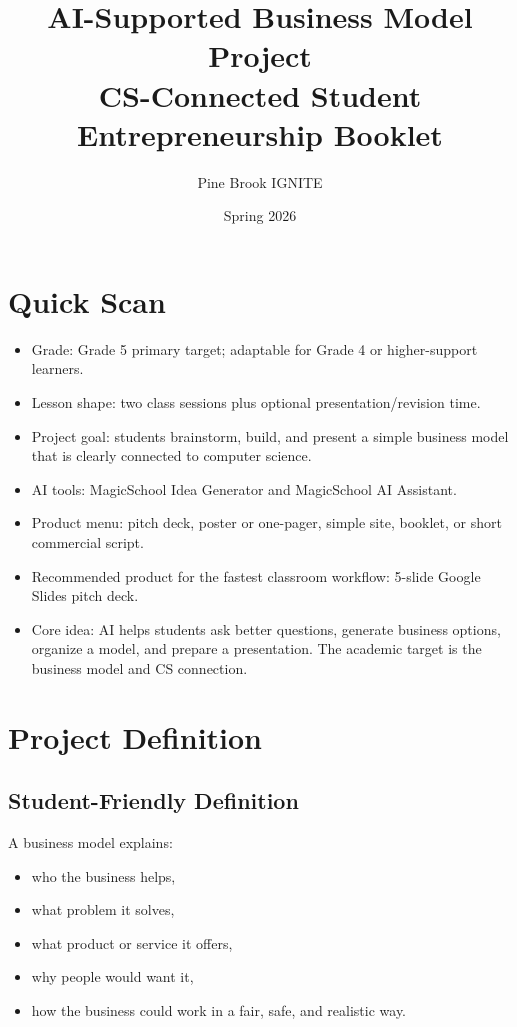 \documentclass[11pt]{article}
\title{AI-Supported Business Model Project\\\large CS-Connected Student Entrepreneurship Booklet}
\author{Pine Brook IGNITE}
\date{Spring 2026}
\begin{document}
\maketitle
\tableofcontents
\newpage

\section{Quick Scan}
\begin{itemize}
  \item Grade: Grade 5 primary target; adaptable for Grade 4 or higher-support learners.
  \item Lesson shape: two class sessions plus optional presentation/revision time.
  \item Project goal: students brainstorm, build, and present a simple business model that is clearly connected to computer science.
  \item AI tools: MagicSchool Idea Generator and MagicSchool AI Assistant.
  \item Product menu: pitch deck, poster or one-pager, simple site, booklet, or short commercial script.
  \item Recommended product for the fastest classroom workflow: 5-slide Google Slides pitch deck.
  \item Core idea: AI helps students ask better questions, generate business options, organize a model, and prepare a presentation. The academic target is the business model and CS connection.
\end{itemize}

\section{Project Definition}
\subsection{Student-Friendly Definition}
A business model explains:
\begin{itemize}
  \item who the business helps,
  \item what problem it solves,
  \item what product or service it offers,
  \item why people would want it,
  \item how the business could work in a fair, safe, and realistic way.
\end{itemize}
\end{document}
